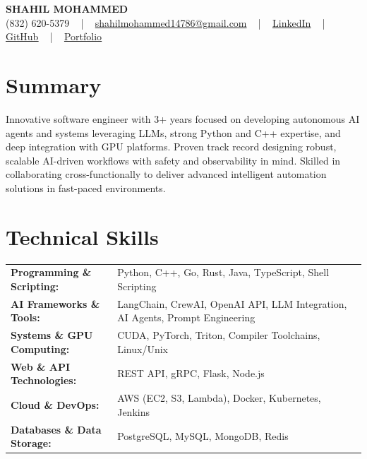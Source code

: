 \documentclass[letterpaper,11pt]{article}
\begin{document}
\begin{center}
    {\fontsize{14pt}{12pt}\selectfont \textbf{\MakeUppercase{Shahil Mohammed}}}\\ \vspace{2pt}
    \fontsize{10pt}{12pt}\selectfont (832) 620-5379 ~ | ~ \href{mailto:shahilmohammed14786@gmail.com}{shahilmohammed14786@gmail.com} ~ | ~  
    \href{https://www.linkedin.com/in/shahil-mohammed-9652931a1/}{\color{blue}\underline{LinkedIn}}  ~ | ~ 
    \href{https://github.com/freakbeast14}{\color{blue}\underline{GitHub}} ~ | ~ 
    \href{https://shahil-mohammed.netlify.app/}{\color{blue}\underline{Portfolio}}
    \vspace{-8pt}
\end{center}

\section{Summary}
\fontsize{9pt}{10pt}\selectfont
Innovative software engineer with 3+ years focused on developing autonomous AI agents and systems leveraging LLMs, strong Python and C++ expertise, and deep integration with GPU platforms. Proven track record designing robust, scalable AI-driven workflows with safety and observability in mind. Skilled in collaborating cross-functionally to deliver advanced intelligent automation solutions in fast-paced environments.
 \vspace{-5pt}
 
\section{Technical Skills}
        \vspace{-14pt}
        \begin{table}[h]
            \fontsize{9pt}{10pt}\selectfont
            \begin{tabular}{p{0.3\linewidth} p{0.7\linewidth}}
                \textbf{Programming \& Scripting:} & Python, C++, Go, Rust, Java, TypeScript, Shell Scripting \\
                \textbf{AI Frameworks \& Tools:} & LangChain, CrewAI, OpenAI API, LLM Integration, AI Agents, Prompt Engineering \\
                \textbf{Systems \& GPU Computing:} & CUDA, PyTorch, Triton, Compiler Toolchains, Linux/Unix \\
                \textbf{Web \& API Technologies:} & REST API, gRPC, Flask, Node.js \\
                \textbf{Cloud \& DevOps:} & AWS (EC2, S3, Lambda), Docker, Kubernetes, Jenkins \\
                \textbf{Databases \& Data Storage:} & PostgreSQL, MySQL, MongoDB, Redis \\
            \end{tabular}
        \end{table}
 \vspace{-15pt}
 
\end{document}
